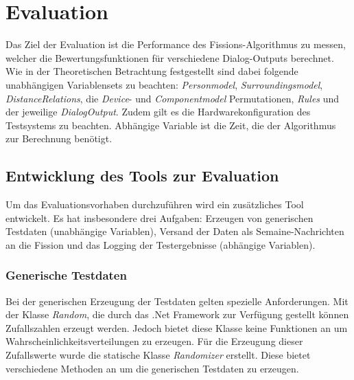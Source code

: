 \chapter{Evaluation}

Das Ziel der Evaluation ist die Performance des Fissions-Algorithmus zu messen, welcher die Bewertungsfunktionen für verschiedene Dialog-Outputs berechnet. Wie in der Theoretischen Betrachtung festgestellt sind dabei folgende unabhängigen Variablensets zu beachten: \emph{Personmodel}, \emph{Surroundingsmodel}, \emph{DistanceRelations}, die \emph{Device}- und \emph{Componentmodel} Permutationen, \emph{Rules} und der jeweilige \emph{DialogOutput}. Zudem gilt es die Hardwarekonfiguration des Testsystems zu beachten.
Abhängige Variable ist die Zeit, die der Algorithmus zur Berechnung benötigt.

\section{Entwicklung des Tools zur Evaluation}
Um das Evaluationsvorhaben durchzuführen wird ein zusätzliches Tool entwickelt. Es hat insbesondere drei Aufgaben: Erzeugen von generischen Testdaten (unabhängige Variablen), Versand der Daten als Semaine-Nachrichten an die Fission und das Logging der Testergebnisse (abhängige Variablen).

\subsection{Generische Testdaten}
Bei der generischen Erzeugung der Testdaten gelten spezielle Anforderungen. Mit der Klasse \emph{Random}, die durch das .Net Framework zur Verfügung gestellt können Zufallszahlen erzeugt werden. Jedoch bietet diese Klasse keine Funktionen an um Wahrscheinlichkeitsverteilungen zu erzeugen. Für die Erzeugung dieser Zufallswerte  wurde die statische Klasse \emph{Randomizer} erstellt. Diese bietet verschiedene Methoden an um die generischen Testdaten zu erzeugen.
